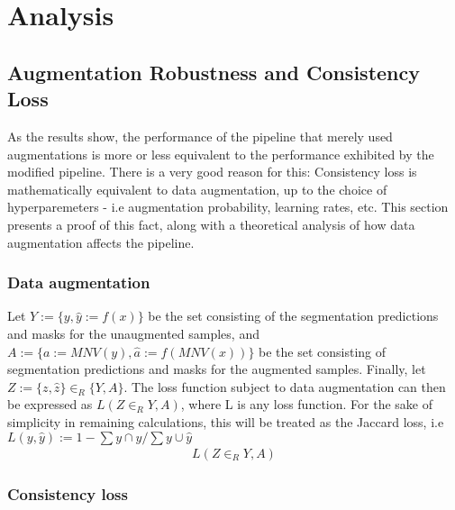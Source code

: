 \chapter{Analysis}
\setcounter{chapter}{5}

\section{Augmentation Robustness and Consistency Loss}
As the results show, the performance of the pipeline that merely used augmentations is more or less equivalent to the performance exhibited by the modified pipeline. There is a very good reason for this: Consistency loss is mathematically equivalent to data augmentation, up to the choice of hyperparemeters - i.e augmentation probability, learning rates, etc. This section presents a proof of this fact, along with a theoretical analysis of how data augmentation affects the pipeline. 
\subsection{Data augmentation}
Let \(Y:=\{y,\hat{y}:=f(x)\}\) be the set consisting of the segmentation predictions and masks for the unaugmented samples, and \(A:=\{a:=MNV(y),\hat{a}:=f(MNV(x))\}\) be the set consisting of segmentation predictions and masks for the augmented samples. Finally, let \(Z:=\{z, \hat{z}\} \in_R \{Y, A\} \). The loss function subject to data augmentation can then be expressed as \(L(Z \in_R Y,A)\), where L is any loss function. For the sake of simplicity in remaining calculations, this will be treated as the Jaccard loss, i.e \(L(y,\hat{y}):=1-\sum y\cap \hat{y} / \sum y \cup \hat{y}\) 
\begin{align*}
L(Z \in_R Y,A)  
\end{align*}
\subsection{Consistency loss}

